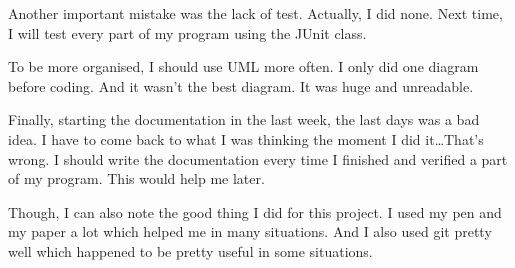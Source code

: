 \documentclass[11pt]{extarticle}
\begin{document}
Another important mistake was the lack of test. Actually, I did none. Next time, I will test every part of my program using the JUnit class. 

To be more organised, I should use UML more often. I only did one diagram before coding. And it wasn't the best diagram. It was huge and unreadable. 

Finally, starting the documentation in the last week, the last days was a bad idea. I have to come back to what I was thinking the moment I did it\dots That's wrong. I should write the documentation every time I finished and verified a part of my program. This would help me later.

Though, I can also note the good thing I did for this project. I used my pen and my paper a lot which helped me in many situations. And I also used git pretty well which happened to be pretty useful in some situations.
\end{document}
